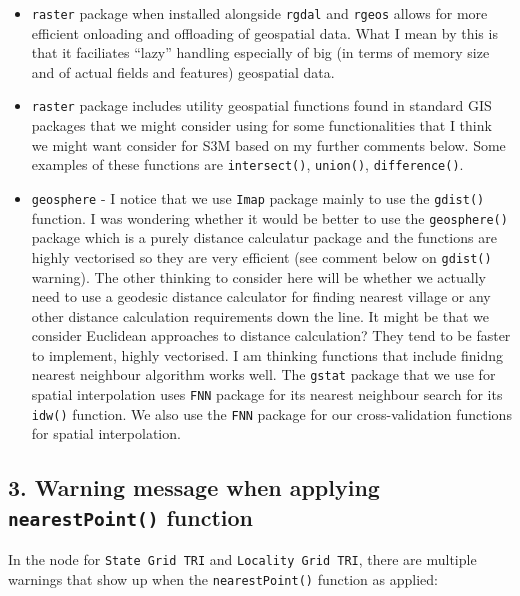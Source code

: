 \documentclass[11pt,a4paper]{article}
\begin{document}
\begin{itemize}
\item
  \texttt{raster} package when installed alongside \texttt{rgdal} and
  \texttt{rgeos} allows for more efficient onloading and offloading of
  geospatial data. What I mean by this is that it faciliates ``lazy''
  handling especially of big (in terms of memory size and of actual
  fields and features) geospatial data.
\item
  \texttt{raster} package includes utility geospatial functions found in
  standard GIS packages that we might consider using for some
  functionalities that I think we might want consider for S3M based on
  my further comments below. Some examples of these functions are
  \texttt{intersect()}, \texttt{union()}, \texttt{difference()}.
\item
  \texttt{geosphere} - I notice that we use \texttt{Imap} package mainly
  to use the \texttt{gdist()} function. I was wondering whether it would
  be better to use the \texttt{geosphere()} package which is a purely
  distance calculatur package and the functions are highly vectorised so
  they are very efficient (see comment below on \texttt{gdist()}
  warning). The other thinking to consider here will be whether we
  actually need to use a geodesic distance calculator for finding
  nearest village or any other distance calculation requirements down
  the line. It might be that we consider Euclidean approaches to
  distance calculation? They tend to be faster to implement, highly
  vectorised. I am thinking functions that include finidng nearest
  neighbour algorithm works well. The \texttt{gstat} package that we use
  for spatial interpolation uses \texttt{FNN} package for its nearest
  neighbour search for its \texttt{idw()} function. We also use the
  \texttt{FNN} package for our cross-validation functions for spatial
  interpolation.
\end{itemize}

\newpage

\hypertarget{warning-message-when-applying-nearestpoint-function}{%
\subsection{\texorpdfstring{3. Warning message when applying
\texttt{nearestPoint()}
function}{3. Warning message when applying nearestPoint() function}}\label{warning-message-when-applying-nearestpoint-function}}

In the node for \texttt{State\ Grid\ TRI} and
\texttt{Locality\ Grid\ TRI}, there are multiple warnings that show up
when the \texttt{nearestPoint()} function as applied:
\end{document}
